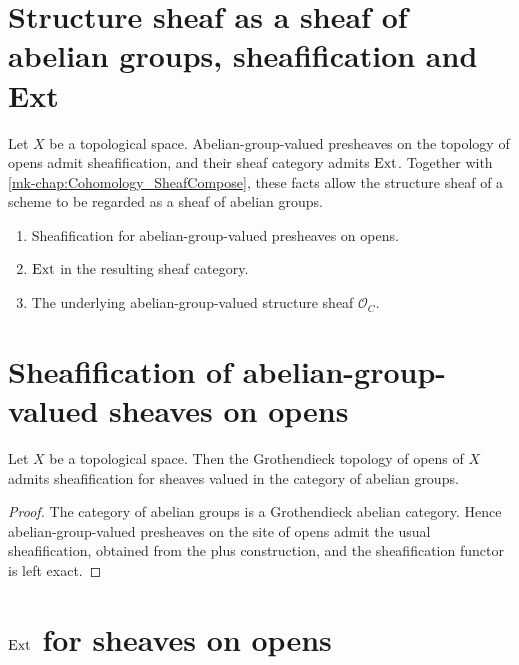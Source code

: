 \section{Structure sheaf as a sheaf of abelian groups, sheafification and Ext}
\label{mk-chap:Cohomology_StructureSheafAb}

Let \(X\) be a topological space. Abelian-group-valued presheaves on the topology of opens admit sheafification, and their sheaf category admits \(\operatorname{Ext}\). Together with \ref{mk-chap:Cohomology_SheafCompose}, these facts allow the structure sheaf of a scheme to be regarded as a sheaf of abelian groups.

\begin{enumerate}
  \item Sheafification for abelian-group-valued presheaves on opens.
  \item \(\operatorname{Ext}\) in the resulting sheaf category.
  \item The underlying abelian-group-valued structure sheaf \(\mathcal O_C\).
\end{enumerate}

\section{Sheafification of abelian-group-valued sheaves on opens}

\begin{theorem}\label{mk-thm:HasSheafify_Opens_AddCommGrp}
  \leanok

  Let \(X\) be a topological space. Then the Grothendieck topology of opens of \(X\) admits sheafification for sheaves valued in the category of abelian groups.
\end{theorem}

\begin{proof}
  \leanok


The category of abelian groups is a Grothendieck abelian category. Hence abelian-group-valued presheaves on the site of opens admit the usual sheafification, obtained from the plus construction, and the sheafification functor is left exact.
\end{proof}

\section{\(\operatorname{Ext}\) for sheaves on opens}

